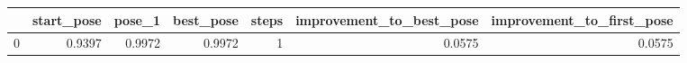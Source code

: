 \begin{tabular}{lrrrrrr}
\toprule
{} &  start\_pose &  pose\_1 &  best\_pose &  steps &  improvement\_to\_best\_pose &  improvement\_to\_first\_pose \\
\midrule
0 &      0.9397 &  0.9972 &     0.9972 &      1 &                    0.0575 &                     0.0575 \\
\bottomrule
\end{tabular}
